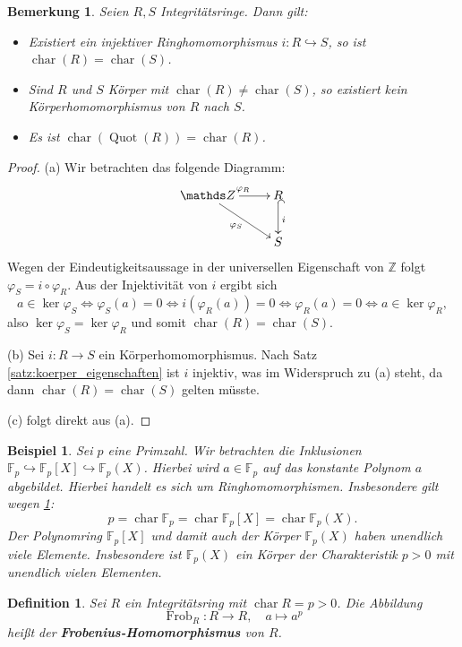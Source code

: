 \documentclass[a4paper, twoside, 11pt, ngerman]{report}
\newcommand{\FF}{\mathds F}
\newcommand{\ZZ}{\mathds Z}
\DeclareMathOperator{\charact}{char}
\DeclareMathOperator{\Frob}{Frob}
\DeclareMathOperator{\Quot}{Quot}
\theoremstyle{definistyle}
\newtheorem{defini}[satz]{Definition}
\newtheorem{bem}[satz]{Bemerkung}
\newtheorem{bsp}[satz]{Beispiel}
\theoremstyle{remark}
\newcommand{\defn}[1]{\textit{\bfseries #1}}
\begin{document}
\begin{bem}\label{bem:charakteristik_int_koerper}
Seien $R, S$ Integritätsringe. Dann gilt:
\begin{itemize}
    \item[(a)] Existiert ein injektiver Ringhomomorphismus $i \colon R \hookrightarrow S$, so ist $\charact(R) = \charact(S)$.
    \item[(b)] Sind $R$ und $S$ Körper mit $\charact(R) \neq \charact(S)$, so existiert kein Körperhomomorphismus von $R$ nach $S$.
    \item[(c)] Es ist $\charact(\Quot(R))=\charact(R)$.
\end{itemize}
\end{bem}

\begin{proof}
(a) Wir betrachten das folgende Diagramm:
\[
\xymatrix{
\ZZ \ar[r]^{\varphi_R} \ar[dr]_{\varphi_S} & R \ar@{^{(}->}[d]^i \\
& S
}
\]
Wegen der Eindeutigkeitsaussage in der universellen Eigenschaft von $\ZZ$ folgt $\varphi_S = i \circ \varphi_R$. 
Aus der Injektivität von $i$ ergibt sich
\[
a \in \ker \varphi_S \iff \varphi_S(a) = 0 \iff i(\varphi_R(a)) = 0 \iff \varphi_R(a) = 0 \iff a \in \ker \varphi_R,
\]
also $\ker \varphi_S = \ker \varphi_R$ und somit $\charact(R) = \charact(S)$.

(b) Sei $i \colon R \to S$ ein Körperhomomorphismus. Nach Satz \ref{satz:koerper_eigenschaften} ist $i$ injektiv, was im Widerspruch zu (a) steht, da dann $\charact(R) = \charact(S)$ gelten müsste.

(c) folgt direkt aus (a).
\end{proof}

\begin{bsp}
Sei $p$ eine Primzahl. Wir betrachten die Inklusionen $\FF_p\hookrightarrow\FF_p[X]\hookrightarrow\FF_p(X)$. Hierbei wird $a\in\FF_p$
auf das konstante Polynom $a$ abgebildet. Hierbei handelt es sich um Ringhomomorphismen.
Insbesondere gilt wegen \ref{bem:charakteristik_int_koerper}:
\[
p=\charact \FF_p=\charact \FF_p[X]=\charact\FF_p(X).
\]
Der Polynomring $\FF_p[X]$ und damit auch der Körper $\FF_p(X)$ haben unendlich viele Elemente.
Insbesondere ist $\FF_p(X)$ ein Körper der Charakteristik $p>0$ mit unendlich vielen Elementen.
\end{bsp}

\begin{defini}\label{bem:frobenius_hom}
Sei $R$ ein Integritätsring mit $\charact R = p > 0$. Die Abbildung
\[
\Frob_R \colon R \to R, \quad a \mapsto a^p
\]
heißt der \defn{Frobenius-Homomorphismus} von $R$.
\end{defini}
\end{document}
